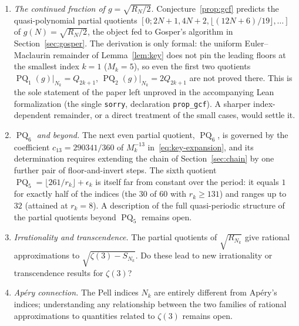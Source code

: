 \documentclass[12pt]{amsart}
\theoremstyle{definition}
\newcommand{\floor}[1]{\lfloor #1 \rfloor}
\DeclareMathOperator{\PQ}{PQ}
\begin{document}
\begin{enumerate}
  \item \textit{The continued fraction of $g = \sqrt{R_N/2}$.}\label{op:gcf}
    Conjecture~\ref{prop:gcf} predicts the quasi-polynomial partial quotients
    $[0; 2N+1, 4N+2, \floor{(12N+6)/19}, \ldots]$ of $g(N) = \sqrt{R_N/2}$,
    the object fed to Gosper's algorithm in Section~\ref{sec:gosper}.  The
    derivation is only formal: the uniform Euler--Maclaurin remainder of
    Lemma~\ref{lem:key} does not pin the leading floors at the smallest index
    $k = 1$ ($M_k = 5$), so even the first two quotients
    $\PQ_1(g)|_{N_k} = Q_{2k+1}$, $\PQ_2(g)|_{N_k} = 2Q_{2k+1}$ are not proved
    there.  This is the sole statement of the paper left unproved in the
    accompanying Lean formalization (the single \texttt{sorry}, declaration
    \texttt{prop\_gcf}).  A sharper index-dependent remainder, or a direct
    treatment of the small cases, would settle it.

  \item \textit{$\PQ_6$ and beyond.}
    The next even partial quotient, $\PQ_6$, is governed by the coefficient
    $c_{13} = 290341/360$ of $M_k^{-13}$ in~\eqref{eq:key-expansion}, and its
    determination requires extending the chain of Section~\ref{sec:chain} by
    one further pair of floor-and-invert steps.  The sixth quotient
    $\PQ_5 = \floor{261/r_k} + \epsilon_k$ is itself far from constant over
    the period: it equals $1$ for exactly half of the indices (the $30$ of
    $60$ with $r_k \ge 131$) and ranges up to $32$ (attained at $r_k = 8$).
    A description of the full quasi-periodic structure of the partial
    quotients beyond $\PQ_5$ remains open.

  \item \textit{Irrationality and transcendence.}
    The partial quotients of $\sqrt{R_{N_k}}$ give rational approximations
    to $\sqrt{\zeta(3) - S_{N_k}}$.  Do these lead to new irrationality
    or transcendence results for $\zeta(3)$?

  \item \textit{Ap\'ery connection.}
    The Pell indices $N_k$ are entirely different from Ap\'ery's indices;
    understanding any relationship between the two families of rational
    approximations to quantities related to $\zeta(3)$ remains open.
\end{enumerate}
\end{document}
